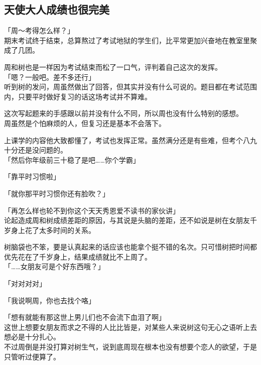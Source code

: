 \subsection{天使大人成绩也很完美}

「周～考得怎么样？」\\

期末考试终于结束，总算熬过了考试地狱的学生们，比平常更加兴奋地在教室里聚成了几团。

周和树也是一样因为考试结束而松了一口气，评判着自己这次的发挥。\\

「嗯？一般吧。差不多还行」\\

听到树的发问，周虽然做出了回答，但其实并没有什么可说的。题目都在考试范围内，只要平时做好复习的话这场考试并不算难。

这次写起题来的手感跟以前并没有什么不同，所以周也没有什么特别的感想。\\

周虽然是个怕麻烦的人，但复习还是基本不会落下。

上课学的内容他大致都懂了，考试也发挥正常。虽然满分还是有些难，但考个八九十分还是没问题的。\\

「然后你年级前三十稳了是吧……你个学霸」

「靠平时习惯啦」

「就你那平时习惯你还有脸吹？」

「再怎么样也轮不到你这个天天秀恩爱不读书的家伙讲」\\

论起造成周和树成绩差距的原因，与其说是头脑的差距，还不如说是树在女朋友千岁身上花了太多时间的关系。

树脑袋也不笨，要是认真起来的话应该也能拿个挺不错的名次。只可惜树把时间都优先花在了千岁身上，结果成绩就比不上周了。\\

「……女朋友可是个好东西哦？」

「对对对对」

「我说啊周，你也去找个咯」

「想有就能有那这世上男儿们也不会流下血泪了啊」\\

这世上想要女朋友而求之不得的人比比皆是，对某些人来说树这句无心之语听上去想必是十分扎心。\\

不过周倒是并没打算对树生气，说到底周现在根本也没有想要个恋人的欲望，于是只管听过便算了。\\

